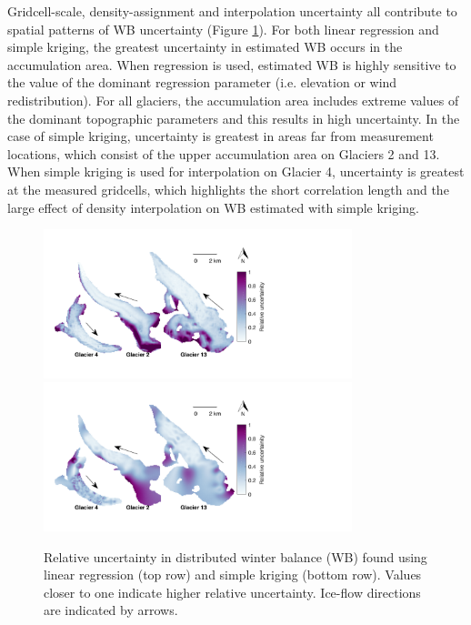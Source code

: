 \documentclass{sfuthesis}
\begin{document}
{Gridcell-scale, density-assignment and interpolation uncertainty all contribute to spatial patterns of WB uncertainty (Figure \ref{fig:WSMBspatialvar}). For both linear regression and simple kriging, the greatest uncertainty in estimated WB occurs in the accumulation area. When regression is used, estimated WB is highly sensitive to the value of the dominant regression parameter (i.e. elevation or wind redistribution). For all glaciers, the accumulation area includes extreme values of the dominant topographic parameters and this results in high uncertainty. In the case of simple kriging, uncertainty is greatest in areas far from measurement locations, which consist of the upper accumulation area on Glaciers 2 and 13. When simple kriging is used for interpolation on Glacier 4, uncertainty is greatest at the measured gridcells, which highlights the short correlation length and the large effect of density interpolation on WB estimated with simple kriging.

\begin{figure}[H]
	\centering
	\includegraphics[width =0.8\textwidth]{SpatialVar_LR.pdf}\\
	\includegraphics[width =0.8\textwidth]{SpatialVar_SK.pdf}\\
	\caption[Relative uncertainty in distributed winter balance (WB) found using linear regression and simple kriging]{Relative uncertainty in distributed winter balance (WB) found using linear regression (top row) and simple kriging (bottom row). Values closer to one indicate higher relative uncertainty. Ice-flow directions are indicated by arrows.}
	\label{fig:WSMBspatialvar}
\end{figure}


}
\end{document}
